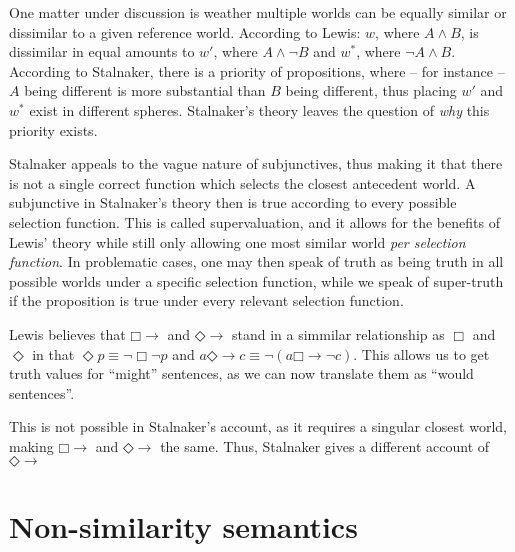 \documentclass[12pt]{report}
\newcommand{\would}{{\mathbin{\Box}{\rightarrow}}}
\newcommand{\might}{{\mathbin{\Diamond}{\rightarrow}}}
\begin{document}
One matter under discussion is weather multiple worlds can be equally similar or
dissimilar to a given reference world. According to Lewis: $w$, where $A \land
B$, is dissimilar in equal amounts to $w'$, where $A \land \lnot B$ and $w^*$,
where $\lnot A \land B$. According to Stalnaker, there is a priority of
propositions, where -- for instance -- $A$ being different is more substantial
than $B$ being different, thus placing $w'$ and $w^*$ exist in different
spheres. Stalnaker's theory leaves the question of \emph{why} this priority
exists.

Stalnaker appeals to the vague nature of subjunctives, thus making it that there
is not a single correct function which selects the closest antecedent world. A
subjunctive in Stalnaker's theory then is true according to every possible
selection function. This is called supervaluation, and it allows for the
benefits of Lewis' theory while still only allowing one most similar world
\emph{per selection function}. In problematic cases, one may then speak of truth
as being truth in all possible worlds under a specific selection function, while
we speak of super-truth if the proposition is true under every relevant
selection function.

Lewis believes that $\would$ and $\might$ stand in a simmilar relationship as
$\Box$ and $\Diamond$ in that $\Diamond p \equiv \lnot \Box \lnot p$ and $a
\might c \equiv \lnot (a \would \lnot c)$. This allows us to get truth values
for ``might'' sentences, as we can now translate them as ``would sentences''.

This is not possible in Stalnaker's account, as it requires a singular closest
world, making $\would$ and $\might$ the same. Thus, Stalnaker gives a different
account of $\might$

\chapter{Non-similarity semantics}
\end{document}
